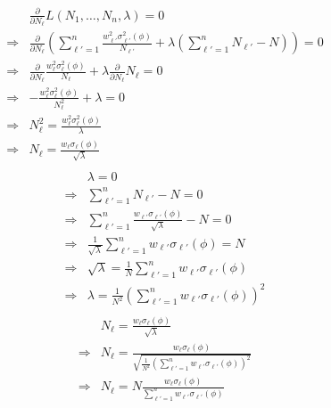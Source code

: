 \documentclass{article}
\begin{document}
\begin{align*}
   & \frac{\partial}{\partial N_\ell} L(N_1,\ldots,N_n,\lambda) = 0 \\
   \Rightarrow& \frac{\partial}{\partial N_\ell} \left(\sum_{\ell'=1}^n \frac{w_{\ell'}^2\sigma_{\ell'}^2(\phi)}{N_{\ell'}}+\lambda\left(\sum_{\ell'=1}^n N_{\ell'} - N\right)\right) = 0 \\
   \Rightarrow&  \frac{\partial}{\partial N_\ell}\frac{w_{\ell}^2\sigma_{\ell}^2(\phi)}{N_{\ell}}+\lambda \frac{\partial}{\partial N_\ell}N_{\ell} = 0 \\
   \Rightarrow&  -\frac{w_{\ell}^2\sigma_{\ell}^2(\phi)}{N_{\ell}^2}+\lambda  = 0 \\
   \Rightarrow& N_\ell^2 = \frac{w_{\ell}^2\sigma_{\ell}^2(\phi)}{\lambda} \\
   \Rightarrow& N_\ell = \frac{w_{\ell}\sigma_{\ell}(\phi)}{\sqrt\lambda} \\
\end{align*}
\begin{align*}
   & \lambda = 0 \\
   \Rightarrow& \sum_{\ell'=1}^n N_{\ell'} - N = 0 \\
   \Rightarrow& \sum_{\ell'=1}^n \frac{w_{\ell'}\sigma_{\ell'}(\phi)}{\sqrt\lambda} - N = 0 \\
   \Rightarrow& \frac{1}{\sqrt\lambda}\sum_{\ell'=1}^n w_{\ell'}\sigma_{\ell'}(\phi) = N \\
   \Rightarrow& \sqrt{\lambda} = \frac{1}{N}\sum_{\ell'=1}^n w_{\ell'}\sigma_{\ell'}(\phi) \\
   \Rightarrow& \lambda = \frac{1}{N^2}\left(\sum_{\ell'=1}^n w_{\ell'}\sigma_{\ell'}(\phi)\right)^2 \\
\end{align*}
\begin{align*}
   & N_\ell = \frac{w_{\ell}\sigma_{\ell}(\phi)}{\sqrt\lambda} \\
   \Rightarrow& N_\ell = \frac{w_{\ell}\sigma_{\ell}(\phi)}{\sqrt{\frac{1}{N^2}\left(\sum_{\ell'=1}^n w_{\ell'}\sigma_{\ell'}(\phi)\right)^2}} \\
   \Rightarrow& N_\ell = N\frac{w_{\ell}\sigma_{\ell}(\phi)}{\sum_{\ell'=1}^n w_{\ell'}\sigma_{\ell'}(\phi)} \\
\end{align*}
\end{document}
